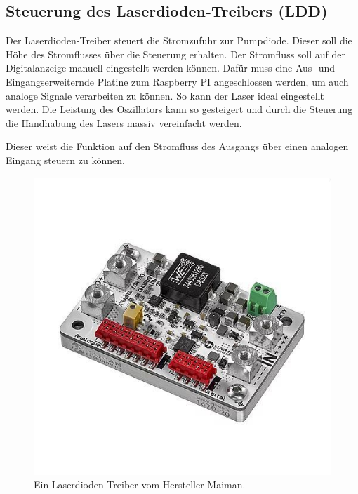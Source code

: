 \subsection{Steuerung des Laserdioden-Treibers (LDD)}
Der Laserdioden-Treiber steuert die Stromzufuhr zur Pumpdiode. Dieser soll die Höhe des Stromflusses über die Steuerung erhalten. Der Stromfluss soll auf der Digitalanzeige manuell eingestellt werden können. Dafür muss eine Aus- und Eingangserweiternde Platine zum Raspberry PI angeschlossen werden, um auch analoge Signale verarbeiten zu können.
So kann der Laser ideal eingestellt werden. Die Leistung des Oszillators kann so gesteigert und durch die Steuerung die Handhabung des Lasers massiv vereinfacht werden.

Dieser weist die Funktion auf den Stromfluss des Ausgangs über einen analogen Eingang steuern zu können.

\begin{figure}[H]
    \centering
    \includegraphics[scale=0.5, trim={0 30mm 0 40mm},clip]{98_images/ldd_maiman.jpg}
    \caption{Ein Laserdioden-Treiber vom Hersteller Maiman.}
    \label{fig:ldd}
\end{figure}

